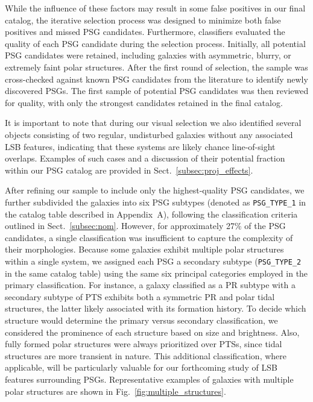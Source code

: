 \documentclass{aa}
\begin{document}
While the influence of these factors may result in some false positives in our final catalog, the iterative selection process was designed to minimize both false positives and missed PSG candidates. Furthermore, classifiers evaluated the quality of each PSG candidate during the selection process. Initially, all potential PSG candidates were retained, including galaxies with asymmetric, blurry, or extremely faint polar structures. After the first round of selection, the sample was cross-checked against known PSG candidates from the literature to identify newly discovered PSGs. The first sample of potential PSG candidates was then reviewed for quality, with only the strongest candidates retained in the final catalog.

It is important to note that during our visual selection we also identified several objects consisting of two regular, undisturbed galaxies without any associated LSB features, indicating that these systems are likely chance line-of-sight overlaps. Examples of such cases and a discussion of their potential fraction within our PSG catalog are provided in Sect.~\ref{subsec:proj_effects}.

After refining our sample to include only the highest-quality PSG candidates, we further subdivided the galaxies into six PSG subtypes (denoted as \texttt{PSG\_TYPE\_1} in the catalog table described in Appendix~A), following the classification criteria outlined in Sect.~\ref{subsec:nom}. However, for approximately 27\% of the PSG candidates, a single classification was insufficient to capture the complexity of their morphologies. Because some galaxies exhibit multiple polar structures within a single system, we assigned each PSG a secondary subtype (\texttt{PSG\_TYPE\_2} in the same catalog table) using the same six principal categories employed in the primary classification. For instance, a galaxy classified as a PR subtype with a secondary subtype of PTS exhibits both a symmetric PR and polar tidal structures, the latter likely associated with its formation history. To decide which structure would determine the primary versus secondary classification, we considered the prominence of each structure based on size and brightness. Also, fully formed polar structures were always prioritized over PTSs, since tidal structures are more transient in nature. This additional classification, where applicable, will be particularly valuable for our forthcoming study of LSB features surrounding PSGs. Representative examples of galaxies with multiple polar structures are shown in Fig.~\ref{fig:multiple_structures}.
\end{document}
